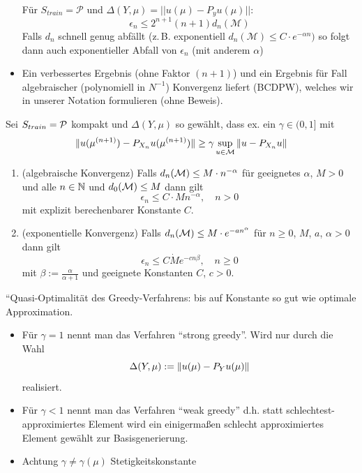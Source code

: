 \begin{bem}
\begin{itemize}
		Für $S_{train} = \mathcal{P}$ und $\Delta(Y,\mu) = ||u(\mu) - P_yu(\mu)||$:
		\[
			\epsilon_n \leq 2^{n+1}(n+1) d_n(\mathcal{M})
		\]
		Falls $d_n$ schnell genug abfällt (z.\,B. exponentiell $d_n(\mathcal{M}) \leq C \cdot e^{-\alpha n})$ so folgt dann auch exponentieller Abfall von $\epsilon_n$ (mit anderem $\alpha$)
		\item Ein verbessertes Ergebnis (ohne Faktor $(n+1)$) und ein Ergebnis für Fall algebraischer (polynomiell in $N^{-1}$) Konvergenz liefert (BCDPW), welches wir in unserer Notation formulieren (ohne Beweis).
	\end{itemize}
\end{bem}

\begin{satz}
	Sei $S_{train} = \mathcal{P}$ kompakt und $\Delta(Y,\mu)$ so gewählt, dass ex. ein $\gamma \in (0,1]$ mit
	\begin{equation} \label{eq:3.24}
		\|u(\mu^{(n+1)}) - P_{X_n} u(\mu^{(n+1)})\| \geq \gamma \sup_{u \in \mathcal{M}} \|u-P_{X_n} u\|
	\end{equation}
	\begin{enumerate}
		\item (algebraische Konvergenz) Falls $d_n(\mathcal{M}) \leq M \cdot n^{-\alpha}$ für geeignetes $\alpha$, $M > 0$ und alle $n \in \mathbb{N}$ und $d_0(\mathcal{M}) \leq M$ dann gilt
			\[
				\epsilon_n \leq C \cdot M n^{-\alpha}, \quad n > 0
			\]
			mit explizit berechenbarer Konstante $C$.
		\item (exponentielle Konvergenz) Falls $d_n(\mathcal{M}) \leq M \cdot e^{-an^\alpha}$ für $n \geq 0$, $M$, $a$, $\alpha > 0$ dann gilt
			\[
				\epsilon_n \leq C \dot M e^{-cn\beta}, \quad n \geq 0
			\]
			mit $\beta := \frac{\alpha}{\alpha+1}$ und geeignete Konstanten $C$, $c > 0$.
	\end{enumerate}
\end{satz}

\begin{bem}
	``Quasi-Optimalität des Greedy-Verfahrens: bis auf Konstante so gut wie optimale Approximation.
\end{bem}

\begin{bem} \beginwithlistbem
	\begin{itemize}
		\item Für $\gamma = 1$ nennt man das Verfahren ``strong greedy''.
			Wird nur durch die Wahl
			\[
				\Delta(Y,\mu) := \|u(\mu)-P_Y u(\mu)\|
			\]
			realisiert.
		\item Für $\gamma < 1$ nennt man das Verfahren ``weak greedy'' d.h. statt schlechtest-approximiertes Element wird ein einigermaßen schlecht approximiertes Element gewählt zur Basisgenerierung.
		\item Achtung $\gamma \neq \gamma(\mu)$ Stetigkeitskonstante
	\end{itemize}
\end{bem}

